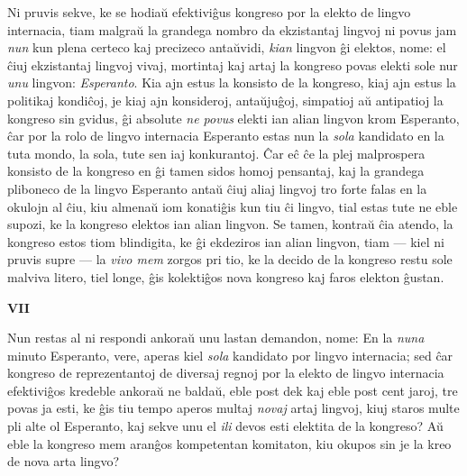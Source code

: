    Ni pruvis sekve, ke se hodia\u u efektivi\^gus kongreso por la elekto
de lingvo internacia, tiam malgra\u u la grandega nombro da
ekzistantaj lingvoj ni povus jam {\sl nun} kun plena certeco kaj
precizeco anta\u uvidi, {\sl kian} lingvon \^gi elektos, nome: el
\^ciuj ekzistantaj lingvoj vivaj, mortintaj kaj artaj la kongreso
povas elekti sole nur {\sl unu} lingvon: {\sl Esperanto}. Kia ajn
estus la konsisto de la kongreso, kiaj ajn estus la politikaj
kondi\^coj, je kiaj ajn konsideroj, anta\u uju\^goj, simpatioj a\u u
antipatioj la kongreso sin gvidus, \^gi absolute {\sl ne povus}
elekti ian alian lingvon krom Esperanto, \^car por la rolo de lingvo
internacia Esperanto estas nun la {\sl sola} kandidato en la tuta
mondo, la sola, tute sen iaj konkurantoj. \^Car e\^c \^ce la plej
malprospera konsisto de la kongreso en \^gi tamen sidos homoj
pensantaj, kaj la grandega pliboneco de la lingvo Esperanto anta\u u
\^ciuj aliaj lingvoj tro forte falas en la okulojn al \^ciu, kiu
almena\u u iom konati\^gis kun tiu \^ci lingvo, tial estas tute ne
eble supozi, ke la kongreso elektos ian alian lingvon. Se tamen,
kontra\u u \^cia atendo, la kongreso estos tiom blindigita, ke \^gi
ekdeziros ian alian lingvon, tiam --- kiel ni pruvis supre --- la
{\sl vivo mem} zorgos pri tio, ke la decido de la kongreso restu
sole malviva litero, tiel longe, \^gis kolekti\^gos nova kongreso
kaj faros elekton \^gustan.

\newpage 

\begin{center}
\textbf{VII}
\end{center}

   Nun restas al ni respondi ankora\u u unu lastan demandon, nome: En la
{\sl nuna} minuto Esperanto, vere, aperas kiel {\sl sola} kandidato
por lingvo internacia; sed \^car kongreso de reprezentantoj de
diversaj regnoj por la elekto de lingvo internacia efektivi\^gos
kredeble ankora\u u ne balda\u u, eble post dek kaj eble post cent
jaroj, tre povas ja esti, ke \^gis tiu tempo aperos multaj {\sl
novaj} artaj lingvoj, kiuj staros multe pli alte ol Esperanto, kaj
sekve unu el {\sl ili} devos esti elektita de la kongreso? A\u u
eble la kongreso mem aran\^gos kompetentan komitaton, kiu okupos sin
je la kreo de nova arta lingvo?

